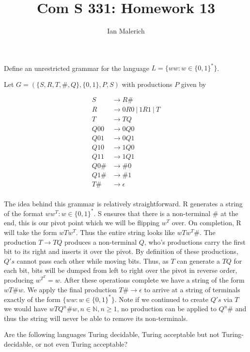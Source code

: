 \documentclass[12pt]{jhwhw}
\author{Ian Malerich}
\title{Com S 331: Homework 13}
\begin{document}
\raggedright

\problem{}

	Define an unrestricted grammar for the language $L = \{ww : w\in \{0,1\}^*\}$.

\solution

	Let $G = (\{S, R, T, \#, Q\}, \{0,1\}, P, S)$ with productions $P$ given by

	\begin{align*}
		S &\rightarrow R\# \\
		R &\rightarrow 0R0\ |\ 1R1\ |\ T \\
		T &\rightarrow TQ \\
		Q00 &\rightarrow 0Q0 \\
		Q01 &\rightarrow 0Q1 \\
		Q10 &\rightarrow 1Q0 \\
		Q11 &\rightarrow 1Q1 \\
		Q0\# &\rightarrow \#0 \\
		Q1\# &\rightarrow \#1 \\
		T\# &\rightarrow \epsilon \\
	\end{align*}

	The idea behind this grammar is relatively straightforward. R generates a string of the format
	$ww^T : w\in \{0,1\}^*$. S ensures that there is a non-terminal $\#$ at the end, this is our pivot point
	which we will be flipping $w^T$ over. On completion, R will take the form $wTw^T$. Thus the entire
	string looks like $wTw^T\#$. The production $T\rightarrow TQ$ produces a non-terminal $Q$, who's productions
	carry the first bit to its right and inserts it over the pivot. By definition of these productions, $Q's$ cannot
	pass each other while moving bits. Thus, as $T$ can generate a $TQ$ for each bit, bits will be dumped
	from left to right over the pivot in reverse order, producing $w^T^T = w$. After these operations
	complete we have a string of the form $wT\#w$. We apply the final production $T\#\rightarrow \epsilon$ to
	arrive at a string of terminals exactly of the form $\{ww : w\in \{0,1\}^*\}$. Note if we continued
	to create $Q's$ via $T$ we would have $wTQ^n\#w, n\in \mathbb{N}, n\geq 1$, 
	no production can be applied to $Q^n\#$ and thus the string will never be able to remove its non-terminals.

\problem{}

	Are the following languages Turing decidable, Turing acceptable but not Turing-decidable,
	or not even Turing acceptable?
\end{document}

